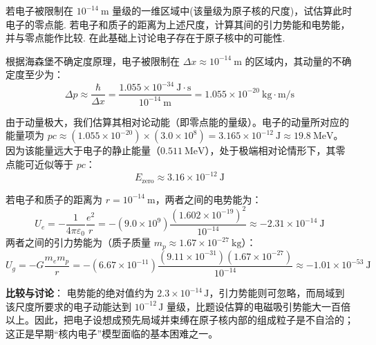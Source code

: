 \begin{exercise}\label{ex:24.1}
若电子被限制在 $10^{-14} \ \mathrm{m}$ 量级的一维区域中(该量级为原子核的尺度)，试估算此时电子的零点能. 若电子和质子的距离为上述尺度，计算其间的引力势能和电势能，并与零点能作比较. 在此基础上讨论电子存在于原子核中的可能性.
\end{exercise}
\begin{solution}
根据海森堡不确定度原理，电子被限制在 $\Delta x \approx 10^{-14} \ \mathrm{m}$ 的区域内，其动量的不确定度至少为：
$$ \Delta p \approx \frac{\hbar}{\Delta x} = \frac{1.055 \times 10^{-34} \ \mathrm{J \cdot s}}{10^{-14} \ \mathrm{m}} = 1.055 \times 10^{-20} \ \mathrm{kg \cdot m/s} $$

由于动量极大，我们估算其相对论动能（即零点能的量级）。电子的动量所对应的能量项为 $pc \approx (1.055 \times 10^{-20}) \times (3.0 \times 10^8) = 3.165 \times 10^{-12} \ \mathrm{J} \approx 19.8 \ \mathrm{MeV}$。
因为该能量远大于电子的静止能量（$0.511 \ \mathrm{MeV}$），处于极端相对论情形下，其零点能可近似等于 $pc$：
$$ E_{\text{zero}} \approx 3.16 \times 10^{-12} \ \mathrm{J} $$

若电子和质子的距离为 $r = 10^{-14} \ \mathrm{m}$，两者之间的电势能为：
$$ U_e = - \frac{1}{4\pi\varepsilon_0} \frac{e^2}{r} = - (9.0 \times 10^9) \frac{(1.602 \times 10^{-19})^2}{10^{-14}} \approx -2.31 \times 10^{-14} \ \mathrm{J} $$
两者之间的引力势能为（质子质量 $m_p \approx 1.67 \times 10^{-27} \ \mathrm{kg}$）：
$$ U_g = - G \frac{m_e m_p}{r} = - (6.67 \times 10^{-11}) \frac{(9.11 \times 10^{-31}) (1.67 \times 10^{-27})}{10^{-14}} \approx -1.01 \times 10^{-53} \ \mathrm{J} $$

\textbf{比较与讨论}：
电势能的绝对值约为 $2.3 \times 10^{-14}\,\mathrm{J}$，引力势能则可忽略，而局域到该尺度所要求的电子动能达到 $10^{-12}\,\mathrm{J}$ 量级，比题设估算的电磁吸引势能大一百倍以上。因此，把电子设想成预先局域并束缚在原子核内部的组成粒子是不自洽的；这正是早期“核内电子”模型面临的基本困难之一。
\end{solution}

